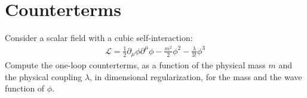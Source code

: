 \documentclass[12pt]{article}
\begin{document}
\section{Counterterms}
\begin{problem}
  Consider a scalar field with a cubic self-interaction:
  \begin{align*}
    \mathcal{L}=\frac{1}{2} \partial_\mu \phi \partial^\mu \phi-\frac{m^2}{2} \phi^2-\frac{\lambda}{3 !} \phi^3
  \end{align*}
  Compute the one-loop counterterms, as a function of the physical mass $m$ and the physical coupling $\lambda$, in dimensional regularization, for the mass and the wave function of $\phi$.
\end{problem}
\end{document}
